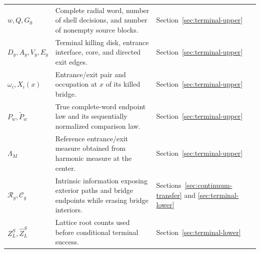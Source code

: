 \documentclass[12pt,reqno]{amsart}
\theoremstyle{plain}
\theoremstyle{definition}
\theoremstyle{remark}
\numberwithin{equation}{section}
\begin{document}
\begin{longtable}{@{}p{}p{}p{}@{}}
$w,Q,G_0$ & Complete radial word, number of shell decisions, and number of nonempty source blocks. & Section~\ref{sec:terminal-upper} \\
$D_y,A_y,V_y,E_y$ & Terminal killing disk, entrance interface, core, and directed exit edges. & Section~\ref{sec:terminal-upper} \\
$\omega_i,X_i(x)$ & Entrance/exit pair and occupation at $x$ of its killed bridge. & Section~\ref{sec:terminal-upper} \\
$P_w,\widetilde P_w$ & True complete-word endpoint law and its sequentially normalized comparison law. & Section~\ref{sec:terminal-upper} \\
$\Lambda_M$ & Reference entrance/exit measure obtained from harmonic measure at the center. & Section~\ref{sec:terminal-upper} \\
$\mathcal R_y,\mathcal C_y$ & Intrinsic information exposing exterior paths and bridge endpoints while erasing bridge interiors. & Sections~\ref{sec:continuum-transfer} and \ref{sec:terminal-lower} \\
$Z_L^S,\widehat Z_L^S$ & Lattice root counts used before conditional terminal success. & Section~\ref{sec:terminal-lower} \\
\bottomrule
\end{longtable}
\normalsize
\end{document}
